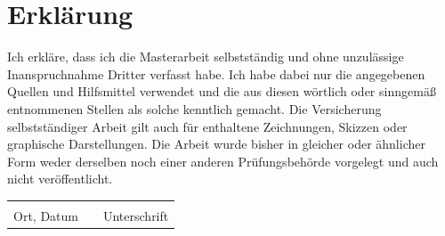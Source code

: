 \documentclass[
    12pt,           %
    a4paper,        %
    oneside,        %
    openany         %
]{report}
\begin{document}
\printbibliography[heading=bibintoc, title=Literaturverzeichnis]

\chapter*{Erklärung}

Ich erkläre, dass ich die Masterarbeit selbstständig und ohne unzulässige Inanspruchnahme Dritter verfasst habe.
Ich habe dabei nur die angegebenen Quellen und Hilfsmittel verwendet und die aus diesen wörtlich oder sinngemäß
entnommenen Stellen als solche kenntlich gemacht. Die Versicherung selbstständiger Arbeit gilt auch für enthaltene
Zeichnungen, Skizzen oder graphische Darstellungen. Die Arbeit wurde bisher in gleicher oder ähnlicher Form weder
derselben noch einer anderen Prüfungsbehörde vorgelegt und auch nicht veröffentlicht.

\vspace{3cm}

\noindent
\begin{tabular}{p{6cm}p{1cm}p{6cm}}
    \dotfill & & \dotfill \\
    Ort, Datum & & Unterschrift \\
\end{tabular}
\end{document}
